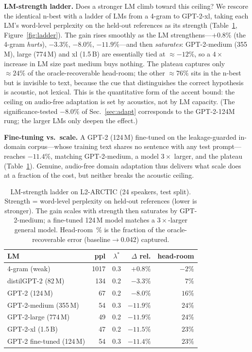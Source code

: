 \documentclass[conference]{IEEEtran}
\begin{document}
\textbf{LM-strength ladder.} Does a stronger LM climb toward this ceiling? We rescore the identical n-best with a ladder of LMs from a 4-gram to GPT-2-xl, taking each LM's word-level perplexity on the held-out references as its strength (Table~\ref{tab:ladder}, Figure~\ref{fig:ladder}). The gain rises smoothly as the LM strengthens---$+0.8\%$ (the 4-gram \emph{hurts}), $-3.3\%$, $-8.0\%$, $-11.9\%$---and then \emph{saturates}: GPT-2-medium (355\,M), large (774\,M) and xl (1.5\,B) are essentially tied at $\approx-12\%$, so a $4\times$ increase in LM size past medium buys nothing. The plateau captures only $\approx24\%$ of the oracle-recoverable head-room; the other $\approx76\%$ sits in the n-best but is invisible to text, because the cue that distinguishes the correct hypothesis is acoustic, not lexical. This is the quantitative form of the accent bound: the ceiling on audio-free adaptation is set by acoustics, not by LM capacity. (The significance-tested $-8.0\%$ of Sec.~\ref{sec:adapt} corresponds to the GPT-2-124M rung; the larger LMs only deepen the effect.)

\textbf{Fine-tuning vs.\ scale.} A GPT-2 (124\,M) fine-tuned on the leakage-guarded in-domain corpus---whose training text shares no sentence with any test prompt---reaches $-11.4\%$, matching GPT-2-medium, a model $3\times$ larger, and the plateau (Table~\ref{tab:ladder}). Genuine, audio-free domain adaptation thus delivers what scale does at a fraction of the cost, but neither breaks the acoustic ceiling.

\begin{table}[t]
\centering
\caption{LM-strength ladder on L2-ARCTIC (24 speakers, test split). Strength = word-level perplexity on held-out references (lower is stronger). The gain scales with strength then saturates by GPT-2-medium; a fine-tuned 124\,M model matches a $3\times$-larger general model. Head-room~\% is the fraction of the oracle-recoverable error (baseline$\to$0.042) captured.}
\label{tab:ladder}
\small
\begin{tabular}{@{}lrcrr@{}}
\toprule
LM & ppl & $\lambda^\ast$ & $\Delta$ rel. & head-room \\
\midrule
4-gram (weak)            & 1017 & 0.3 & $+0.8\%$  & $-2\%$ \\
distilGPT-2 (82\,M)       & 134  & 0.2 & $-3.3\%$  & $7\%$ \\
GPT-2 (124\,M)            & 67   & 0.2 & $-8.0\%$  & $16\%$ \\
GPT-2-medium (355\,M)     & 54   & 0.3 & $-11.9\%$ & $24\%$ \\
GPT-2-large (774\,M)      & 49   & 0.2 & $-11.9\%$ & $24\%$ \\
GPT-2-xl (1.5\,B)         & 47   & 0.2 & $-11.5\%$ & $23\%$ \\
GPT-2 fine-tuned (124\,M) & 54   & 0.3 & $-11.4\%$ & $23\%$ \\
\bottomrule
\end{tabular}
\end{table}
\end{document}
